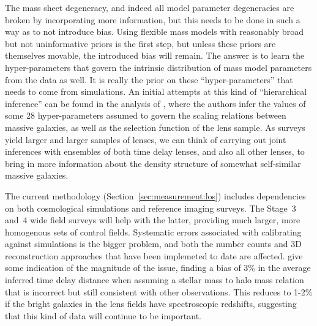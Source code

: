 The mass sheet degeneracy, and indeed all model parameter degeneracies
are broken by incorporating more information, but this needs to be done
in such a way as to not introduce bias. Using flexible mass models with
reasonably broad but not uninformative  priors is the first step, but
unless these priors are themselves movable, the introduced bias will
remain. The answer is to learn the hyper-parameters that govern the
intrinsic distribution of mass model parameters from the data as well. It is
really the prior on these ``hyper-parameters'' that  needs to come from
simulations. An initial attempts at this kind of ``hierarchical
inference'' can be found in  the analysis of \citet{SonnenfeldEtal2015},
where the authors  infer the values of some 28 hyper-parameters assumed
to govern the  scaling relations between massive galaxies, as well as
the selection function of the lens sample. As surveys yield larger and
larger samples of lenses, we can think of  carrying out joint inferences
with ensembles of both time delay lenses, and also all other lenses, to
bring in more information about the density structure of somewhat
self-similar massive galaxies.


 The
current methodology (Section~\ref{sec:measurement:los}) includes
dependencies on both cosmological simulations and reference imaging
surveys. The Stage~3 and~4  wide field surveys will help with the
latter, providing much larger, more homogenous sets of control fields.
Systematic errors associated with calibrating against simulations is the
bigger problem, and both the number counts and 3D reconstruction
approaches that have been implemeted to date are affected.
\citet{CollettEtal2013} give some indication of the magnitude of the
issue, finding a bias of 3\% in the average inferred time delay distance
when assuming a stellar mass to halo mass relation that is incorrect
but still consistent with other observations. This reduces to 1-2\%
if the bright galaxies in the lens fields have spectroscopic redshifts,
suggesting that this kind of data will continue to be important.

